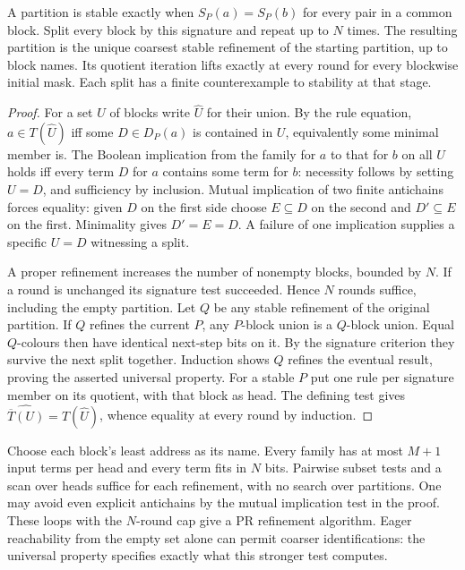 \begin{theorem}\label{th:quot}
A partition is stable exactly when $S_P(a)=S_P(b)$ for every pair in a common block. Split every block by this signature and repeat up to $N$ times. The resulting partition is the unique coarsest stable refinement of the starting partition, up to block names. Its quotient iteration lifts exactly at every round for every blockwise initial mask. Each split has a finite counterexample to stability at that stage.
\end{theorem}
\begin{proof}
For a set $U$ of blocks write $\widehat U$ for their union. By the rule equation,
$a\in T(\widehat U)$ iff some $D\in D_P(a)$ is contained in $U$, equivalently some minimal member is. The Boolean implication from the family for $a$ to that for $b$ on all $U$ holds iff every term $D$ for $a$ contains some term for $b$: necessity follows by setting $U=D$, and sufficiency by inclusion. Mutual implication of two finite antichains forces equality: given $D$ on the first side choose $E\subseteq D$ on the second and $D'\subseteq E$ on the first. Minimality gives $D'=E=D$. A failure of one implication supplies a specific $U=D$ witnessing a split.

A proper refinement increases the number of nonempty blocks, bounded by $N$. If a round is unchanged its signature test succeeded. Hence $N$ rounds suffice, including the empty partition. Let $Q$ be any stable refinement of the original partition. If $Q$ refines the current $P$, any $P$-block union is a $Q$-block union. Equal $Q$-colours then have identical next-step bits on it. By the signature criterion they survive the next split together. Induction shows $Q$ refines the eventual result, proving the asserted universal property. For a stable $P$ put one rule per signature member on its quotient, with that block as head. The defining test gives $\widehat{\overline T(U)}=T(\widehat U)$, whence equality at every round by induction.
\end{proof}
Choose each block's least address as its name. Every family has at most $M+1$ input terms per head and every term fits in $N$ bits. Pairwise subset tests and a scan over heads suffice for each refinement, with no search over partitions. One may avoid even explicit antichains by the mutual implication test in the proof. These loops with the $N$-round cap give a PR refinement algorithm. Eager reachability from the empty set alone can permit coarser identifications: the universal property specifies exactly what this stronger test computes.

